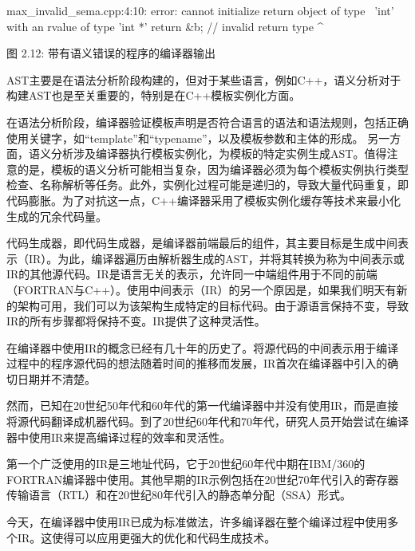 \begin{shell}
max_invalid_sema.cpp:4:10: error: cannot initialize return object of type \
'int' with an rvalue of type 'int *'
  return &b; // invalid return type
         ^~
\end{shell}

\begin{center}
图 2.12: 带有语义错误的程序的编译器输出
\end{center}

AST主要是在语法分析阶段构建的，但对于某些语言，例如C++，语义分析对于构建AST也是至关重要的，特别是在C++模板实例化方面。

在语法分析阶段，编译器验证模板声明是否符合语言的语法和语法规则，包括正确使用关键字，如“template”和“typename”，以及模板参数和主体的形成。
另一方面，语义分析涉及编译器执行模板实例化，为模板的特定实例生成AST。值得注意的是，模板的语义分析可能相当复杂，因为编译器必须为每个模板实例执行类型检查、名称解析等任务。此外，实例化过程可能是递归的，导致大量代码重复，即代码膨胀。为了对抗这一点，C++编译器采用了模板实例化缓存等技术来最小化生成的冗余代码量。


代码生成器，即代码生成器，是编译器前端最后的组件，其主要目标是生成中间表示（IR）。为此，编译器遍历由解析器生成的AST，并将其转换为称为中间表示或IR的其他源代码。IR是语言无关的表示，允许同一中端组件用于不同的前端（FORTRAN与C++）。使用中间表示（IR）的另一个原因是，如果我们明天有新的架构可用，我们可以为该架构生成特定的目标代码。由于源语言保持不变，导致IR的所有步骤都将保持不变。IR提供了这种灵活性。

在编译器中使用IR的概念已经有几十年的历史了。将源代码的中间表示用于编译过程中的程序源代码的想法随着时间的推移而发展，IR首次在编译器中引入的确切日期并不清楚。

然而，已知在20世纪50年代和60年代的第一代编译器中并没有使用IR，而是直接将源代码翻译成机器代码。到了20世纪60年代和70年代，研究人员开始尝试在编译器中使用IR来提高编译过程的效率和灵活性。

第一个广泛使用的IR是三地址代码，它于20世纪60年代中期在IBM/360的FORTRAN编译器中使用。其他早期的IR示例包括在20世纪70年代引入的寄存器传输语言（RTL）和在20世纪80年代引入的静态单分配（SSA）形式。

今天，在编译器中使用IR已成为标准做法，许多编译器在整个编译过程中使用多个IR。这使得可以应用更强大的优化和代码生成技术。




































